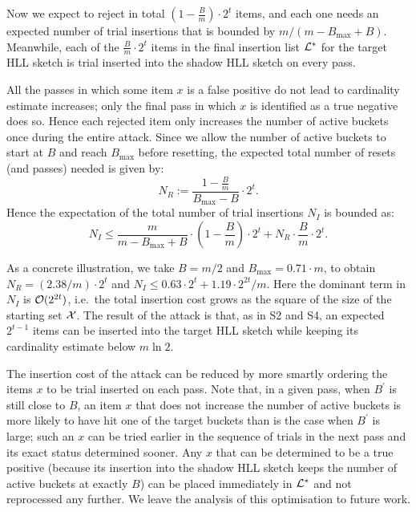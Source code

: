 \documentclass{article}
\begin{document}
Now we expect to reject in total $(1 - \frac{B}{m})\cdot 2^t$ items, and each one needs an expected number of trial insertions that is bounded by $m/(m - B_{\max} + B)$. 
Meanwhile, each of the $\frac{B}{m}\cdot 2^t$ items in the final insertion list ${\cal L}^*$ for the target HLL sketch is trial inserted into the shadow HLL sketch on every pass. 

All the passes in which some item $x$ is a false positive do not lead to cardinality estimate increases; only the final pass in which $x$ is identified as a true negative does so. Hence each rejected item only increases the number of active buckets once during the entire attack. Since we allow the number of active buckets to start at $B$ and reach $B_{\max}$ before resetting, the expected total number of resets (and passes) needed is given by:
\[
N_R:= \frac{1 - \frac{B}{m}}{B_{\max} - B}\cdot 2^t.
\]
Hence the expectation of the total number of trial insertions $N_I$ is bounded as:
\[
N_I \leq \frac{m}{ m-B_{\max} + B} \cdot \left(1 - \frac{B}{m} \right)\cdot 2^t +   N_R \cdot \frac{B}{m}\cdot 2^t.
\]
 
As a concrete illustration, we take $B = m/2$ and $B_{\max} = 0.71\cdot m$, to obtain $N_R = (2.38/m) \cdot 2^t$ and $N_I \leq 0.63 \cdot 2^t + 1.19\cdot 2^{2t}/m$. Here the dominant term in $N_I$ is ${\cal O}(2^{2t})$, i.e.\ the total insertion cost grows as the square of the size of the starting set ${\cal X}$. The result of the attack is that, as in S2 and S4, an expected $2^{t-1}$ items can be inserted into the target HLL sketch while keeping its cardinality estimate below $m \ln 2$.

The insertion cost of the attack can be reduced by more smartly ordering the items $x$ to be trial inserted on each pass. Note that, in a given pass, when $B^\prime$ is still close to $B$, an item $x$ that does not increase the number of active buckets is more likely to have hit one of the target buckets than is the case when $B^\prime$ is large; such an $x$ can be tried earlier in the sequence of trials in the next pass and its exact status determined sooner. Any $x$ that can be determined to be a true positive (because its insertion into the shadow HLL sketch keeps the number of active buckets at exactly $B$) can be placed immediately in ${\cal L}^*$ and not reprocessed any further. We leave the analysis of this optimisation to future work.  
\end{document}
